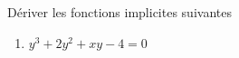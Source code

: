 \begin{exercice}\label{exoFoncDeuxVar0004}

Dériver les fonctions implicites suivantes
\begin{multicols}{2}
\begin{enumerate}
\item
$y^3+2y^2+xy-4=0$ 
\end{enumerate}	
\end{multicols}


\end{exercice}
